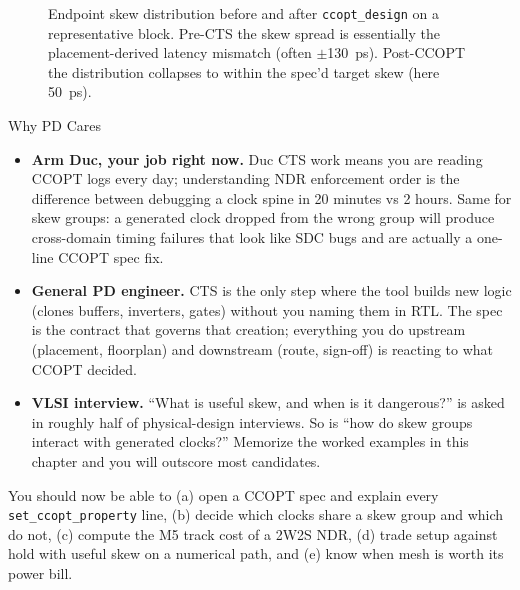 \begin{figure}[h]
\centering
{}
\caption{Endpoint skew distribution before and after \texttt{ccopt\_design} on a representative block. Pre-CTS the skew spread is essentially the placement-derived latency mismatch (often $\pm$130~ps). Post-CCOPT the distribution collapses to within the spec'd target skew (here 50~ps).}
\label{fig:skew-histogram}
\end{figure}

\begin{pdnote}{Why PD Cares}
\begin{itemize}
  \item \textbf{Arm Duc, your job right now.} Duc CTS work means you are reading CCOPT logs every day; understanding NDR enforcement order is the difference between debugging a clock spine in 20 minutes vs 2 hours. Same for skew groups: a generated clock dropped from the wrong group will produce cross-domain timing failures that look like SDC bugs and are actually a one-line CCOPT spec fix.
  \item \textbf{General PD engineer.} CTS is the only step where the tool builds new logic (clones buffers, inverters, gates) without you naming them in RTL. The spec is the contract that governs that creation; everything you do upstream (placement, floorplan) and downstream (route, sign-off) is reacting to what CCOPT decided.
  \item \textbf{VLSI interview.} ``What is useful skew, and when is it dangerous?'' is asked in roughly half of physical-design interviews. So is ``how do skew groups interact with generated clocks?'' Memorize the worked examples in this chapter and you will outscore most candidates.
\end{itemize}
\end{pdnote}

\begin{checkpoint}
You should now be able to (a) open a CCOPT spec and explain every \texttt{set\_ccopt\_property} line, (b) decide which clocks share a skew group and which do not, (c) compute the M5 track cost of a 2W2S NDR, (d) trade setup against hold with useful skew on a numerical path, and (e) know when mesh is worth its power bill.

\end{checkpoint}
